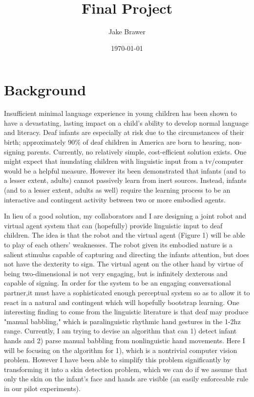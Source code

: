 \documentclass[11pt]{article}
\author{Jake Brawer}
\date{\today}
\title{Final Project}
\begin{document}
\maketitle

\section{Background}
\label{sec:org4bcc19e}

Insufficient minimal language experience in young children has been shown to have a devastating, lasting impact on a child's ability to develop normal language and literacy. Deaf infants are especially at risk due to the circumstances of their birth; approximately 90\% of deaf children in America are born to hearing, non-signing parents. Currently, no relatively simple, cost-efficient solution exists. One might expect that inundating children with linguistic input from a tv/computer would be a helpful measure. However its been demonstrated that infants (and to a lesser extent, adults) cannot passively learn from inert sources. Instead, infants (and to a lesser extent, adults as well) require  the learning process to be an interactive and contingent activity between two or more embodied agents. 

In lieu of a good solution, my collaborators and I are designing a joint robot and virtual agent system that can (hopefully) provide linguistic input to deaf children. The idea is that the robot and the virtual agent (Figure 1) will be able to play of each others' weaknesses. The robot given its embodied nature is a salient stimulus capable of capturing and directing the infants attention, but does not have the dexterity to sign. The virtual agent on the other hand by virtue of being two-dimensional is not very engaging, but is infinitely dexterous and capable of signing. In order for the system to be an engaging conversational partner,it must have a sophisticated enough perceptual system so as to allow it to react in a natural and contingent which will hopefully bootstrap learning. One interesting finding to come from the linguistic literature is that deaf may produce "manual babbling," which is paralinguistic rhythmic hand gestures in the 1-2hz range. Currently, I am trying to devise an algorithm that can 1) detect infant hands and 2) parse manual babbling from nonlinguistic hand movements. Here I will be focusing on the algorithm for 1), which is a nontrivial computer vision problem. However I have been able to simplify this problem significantly by transforming it into a skin detection problem, which we can do if we assume that only the skin on the infant's face and hands are visible (an easily enforceable rule in our pilot experiments). 
\end{document}
